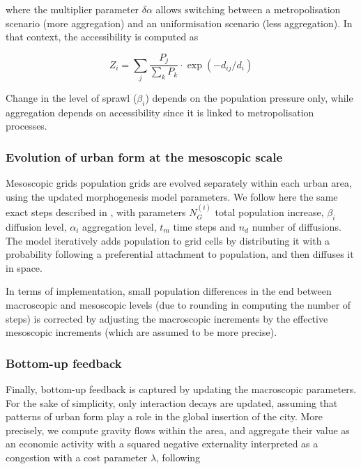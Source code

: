 \documentclass[referee,lineno,pdflatex,sn-apa]{sn-jnl}
\begin{document}
where the multiplier parameter $\delta\alpha$ allows switching between a metropolisation scenario (more aggregation) and an uniformisation scenario (less aggregation). In that context, the accessibility is computed as
			
\begin{equation}
	\label{eq:eq6}
	Z_i = \sum_j \frac{P_j}{\sum_k P_k} \cdot \exp( - d_{ij} / d_i)
\end{equation}
			
Change in the level of sprawl ($\beta_i$) depends on the population pressure only, while aggregation depends on accessibility since it is linked to metropolisation processes.




\subsubsection{Evolution of urban form at the mesoscopic scale}
	
Mesoscopic grids population grids are evolved separately within each urban area, using the updated morphogenesis model parameters. We follow here the same exact steps described in \cite{raimbault2018calibration}, with parameters $N_G^{(i)}$ total population increase, $\beta_i$ diffusion level, $\alpha_i$ aggregation level, $t_m$ time steps and $n_d$ number of diffusions. The model iteratively adds population to grid cells by distributing it with a probability following a preferential attachment to population, and then diffuses it in space.

In terms of implementation, small population differences in the end between macroscopic and mesoscopic levels (due to rounding in computing the number of steps) is corrected by adjusting the macroscopic increments by the effective mesoscopic increments (which are assumed to be more precise).
	

	

\subsubsection{Bottom-up feedback}
	
Finally, bottom-up feedback is captured by updating the macroscopic parameters. For the sake of simplicity, only interaction decays are updated, assuming that patterns of urban form play a role in the global insertion of the city. More precisely, we compute gravity flows within the area, and aggregate their value as an economic activity with a squared negative externality interpreted as a congestion with a cost parameter $\lambda$, following
	
\end{document}
